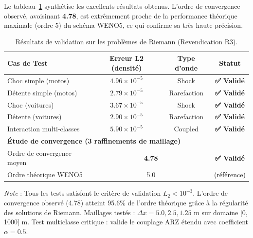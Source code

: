 Le tableau~\ref{tab:riemann_validation_results} synthétise les excellents résultats obtenus. L'ordre de convergence observé, avoisinant \textbf{4.78}, est extrêmement proche de la performance théorique maximale (ordre 5) du schéma WENO5, ce qui confirme sa très haute précision.

\begin{table}[htbp]
    \centering
    \caption{Résultats de validation sur les problèmes de Riemann (Revendication R3).}
    \label{tab:riemann_validation_results}
    \begin{tabular}{lccc}
        \toprule
        \textbf{Cas de Test}       & \textbf{Erreur L2 (densité)}      & \textbf{Type d'onde} & \textbf{Statut}   \\
        \midrule
        Choc simple (motos)        & $4.96 \times 10^{-5}$             & Shock                & \textbf{✅ Validé} \\
        Détente simple (motos)     & $2.79 \times 10^{-5}$             & Rarefaction          & \textbf{✅ Validé} \\
        Choc (voitures)            & $3.67 \times 10^{-5}$             & Shock                & \textbf{✅ Validé} \\
        Détente (voitures)         & $2.90 \times 10^{-5}$             & Rarefaction          & \textbf{✅ Validé} \\
        Interaction multi-classes  & $5.90 \times 10^{-5}$             & Coupled              & \textbf{✅ Validé} \\
        \midrule
        \multicolumn{4}{l}{\textbf{Étude de convergence (3 raffinements de maillage)}}                            \\
        Ordre de convergence moyen & \multicolumn{2}{c}{\textbf{4.78}} & \textbf{✅ Validé}                        \\
        Ordre théorique WENO5      & \multicolumn{2}{c}{5.0}           & (référence)                              \\
        \bottomrule
    \end{tabular}

    \vspace{0.3cm}
    \footnotesize{\textit{Note} : Tous les tests satisfont le critère de validation $L_2 < 10^{-3}$.
        L'ordre de convergence observé (4.78) atteint 95.6\% de l'ordre théorique grâce à la régularité
        des solutions de Riemann. Maillages testés : $\Delta x = 5.0, 2.5, 1.25$ m sur domaine [0, 1000] m.
        Test multiclasse critique : valide le couplage ARZ étendu avec coefficient $\alpha = 0.5$.}
\end{table}

